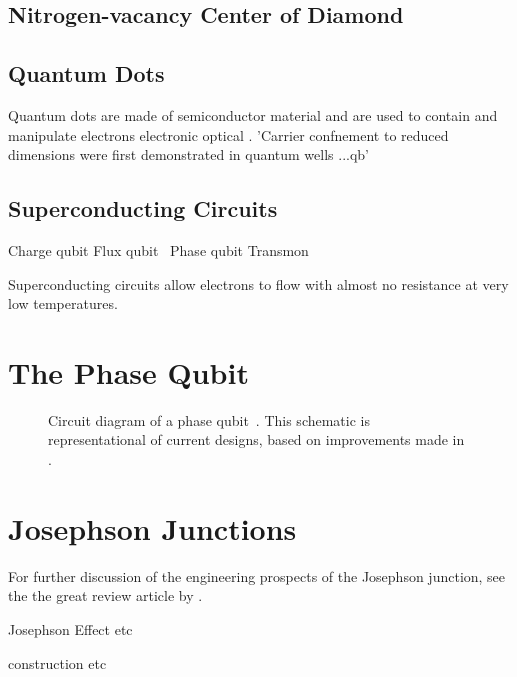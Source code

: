 \subsection{Nitrogen-vacancy Center of Diamond}

\subsection{Quantum Dots}
Quantum dots are made of semiconductor material and are used to contain and manipulate electrons electronic \cite{Chang1974} optical \cite{Dingle1974}. 'Carrier confnement to reduced dimensions were first demonstrated in quantum wells ...qb'

\subsection{Superconducting Circuits}
    Charge qubit Flux qubit~\cite{Plourde2005, Deppe2007}  Phase qubit
Transmon\cite{Wallraff2004, Schreier2008}

Superconducting circuits allow electrons to flow with almost no resistance at very low temperatures.

\section{The Phase Qubit}

\begin{figure}[htp]
\resizebox{0.75\textwidth}{!}{}
\caption[Phase Qubit Circuit Diagram]{\label{fig:qubit}Circuit diagram of a phase qubit~\cite{Clarke1988,Martinis2002}. This schematic is representational of current designs, based on improvements made in .}
\end{figure}


\section{Josephson Junctions}
For further discussion of the engineering prospects of the Josephson junction, see the the great review article by \citeauthor{Makhlin2001}\cite{Makhlin2001}.

Josephson Effect etc

construction etc

